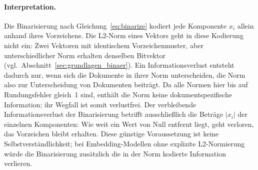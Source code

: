 \paragraph{Interpretation.}
Die Binarisierung nach Gleichung~\ref{eq:binarize} kodiert jede Komponente $x_i$ allein anhand ihres Vorzeichens.
Die L2-Norm eines Vektors geht in diese Kodierung nicht ein: Zwei Vektoren mit identischem Vorzeichenmuster, aber unterschiedlicher Norm erhalten denselben Bitvektor (vgl.\ Abschnitt~\ref{sec:grundlagen_binaer}).
Ein Informationsverlust entsteht dadurch nur, wenn sich die Dokumente in ihrer Norm unterscheiden, die Norm also zur Unterscheidung von Dokumenten beiträgt.
Da alle Normen hier bis auf Rundungsfehler gleich~1 sind, enthält die Norm keine dokumentspezifische Information; ihr Wegfall ist somit verlustfrei.
Der verbleibende Informationsverlust der Binarisierung betrifft ausschließlich die Beträge $|x_i|$ der einzelnen Komponenten: Wie weit ein Wert von Null entfernt liegt, geht verloren, das Vorzeichen bleibt erhalten.
Diese günstige Voraussetzung ist keine Selbstverständlichkeit; bei Embedding-Modellen ohne explizite L2-Normierung würde die Binarisierung zusätzlich die in der Norm kodierte Information verlieren.
%

